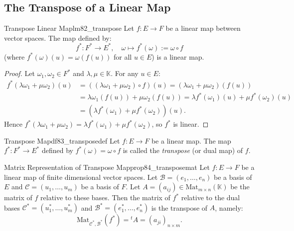 \documentclass[11pt, a4paper]{article}
\newcommand{\K}{\mathbb{K}}
\begin{document}
\subsection{The Transpose of a Linear Map}

\begin{lemma}{Transpose Linear Map}{lm82_transpose}
  Let $f: E \to F$ be a linear map between vector spaces. The map defined by:
  \[
    f^*: F^* \longrightarrow E^*, \quad \omega \longmapsto f^*(\omega) := \omega \circ f
  \]
  (where $f^*(\omega)(u) = \omega(f(u))$ for all $u \in E$) is a linear map.
\end{lemma}

\begin{proof}
  Let $\omega_1, \omega_2 \in F^*$ and $\lambda, \mu \in \K$. For any $u \in E$:
  \begin{align*}
    f^*(\lambda \omega_1 + \mu \omega_2)(u) &= ((\lambda \omega_1 + \mu \omega_2) \circ f)(u) = (\lambda \omega_1 + \mu \omega_2)(f(u)) \\
    &= \lambda \omega_1(f(u)) + \mu \omega_2(f(u)) = \lambda f^*(\omega_1)(u) + \mu f^*(\omega_2)(u) \\
    &= (\lambda f^*(\omega_1) + \mu f^*(\omega_2))(u).
  \end{align*}
  Hence $f^*(\lambda \omega_1 + \mu \omega_2) = \lambda f^*(\omega_1) + \mu f^*(\omega_2)$, so $f^*$ is linear.
\end{proof}

\begin{definition}{Transpose Map}{df83_transposedef}
  Let $f: E \to F$ be a linear map. The map $f^*: F^* \to E^*$ defined by $f^*(\omega) = \omega \circ f$ is called the \emph{transpose} (or dual map) of $f$.
\end{definition}

\begin{proposition}{Matrix Representation of Transpose Map}{prop84_transposemat}
  Let $f: E \to F$ be a linear map of finite dimensional vector spaces. Let $\mathcal{B} = (e_1, \dots, e_n)$ be a basis of $E$ and $\mathcal{C} = (u_1, \dots, u_m)$ be a basis of $F$. 
  Let $A = (a_{ij}) \in \text{Mat}_{m \times n}(\K)$ be the matrix of $f$ relative to these bases. Then the matrix of $f^*$ relative to the dual bases $\mathcal{C}^* = (u_1^*, \dots, u_m^*)$ and $\mathcal{B}^* = (e_1^*, \dots, e_n^*)$ is the transpose of $A$, namely:
  \[
    \text{Mat}_{\mathcal{C}^*, \mathcal{B}^*}(f^*) = {}^t A = (a_{ji})_{n \times m}.
  \]
\end{proposition}
\end{document}
